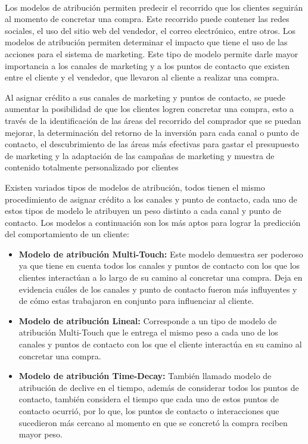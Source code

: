 \\
Los modelos de atribución permiten predecir el recorrido que los clientes seguirán al momento de concretar una compra. Este recorrido puede contener las redes sociales, el uso del sitio web del vendedor, el correo electrónico, entre otros. Los modelos de atribución permiten determinar el impacto que tiene el uso de las acciones para el sistema de marketing. Este tipo de modelo permite darle mayor importancia a los canales de marketing y a los puntos de contacto que existen entre el cliente y el vendedor, que llevaron al cliente a realizar una compra.

Al asignar crédito a sus canales de marketing y puntos de contacto, se puede aumentar la posibilidad de que los clientes logren concretar una compra, esto a través de la identificación de las áreas del recorrido del comprador que se puedan mejorar, la determinación del retorno de la inversión para cada canal o punto de contacto, el descubrimiento de las áreas más efectivas para gastar el presupuesto de marketing y la adaptación de las campañas de marketing y muestra de contenido totalmente personalizado por clientes \cite{modelo-atribucion}

Existen variados tipos de modelos de atribución, todos tienen el mismo procedimiento de asignar crédito a los canales y punto de contacto, cada uno de estos tipos de modelo le atribuyen un peso distinto a cada canal y punto de contacto. Los modelos a continuación son los más aptos para lograr la predicción del comportamiento de un cliente:

\begin{itemize}
    \item \textbf{Modelo de atribución Multi-Touch:} Este modelo demuestra ser poderoso ya que tiene en cuenta todos los canales y puntos de contacto con los que los clientes interactúan a lo largo de su camino al concretar una compra. Deja en evidencia cuáles de los canales y punto de contacto fueron más influyentes y de cómo estas trabajaron en conjunto para influenciar al cliente.
    \item \textbf{Modelo de atribución Lineal:} Corresponde a un tipo de modelo de atribución Multi-Touch que le entrega el mismo peso a cada uno de los canales y puntos de contacto con los que el cliente interactúa en su camino al concretar una compra.
    \item \textbf{Modelo de atribución Time-Decay:} También llamado modelo de atribución de declive en el tiempo, además de considerar todos los puntos de contacto, también considera el tiempo que cada uno de estos puntos de contacto ocurrió, por lo que, los puntos de contacto o interacciones que sucedieron más cercano al momento en que se concretó la compra reciben mayor peso.
\end{itemize}

